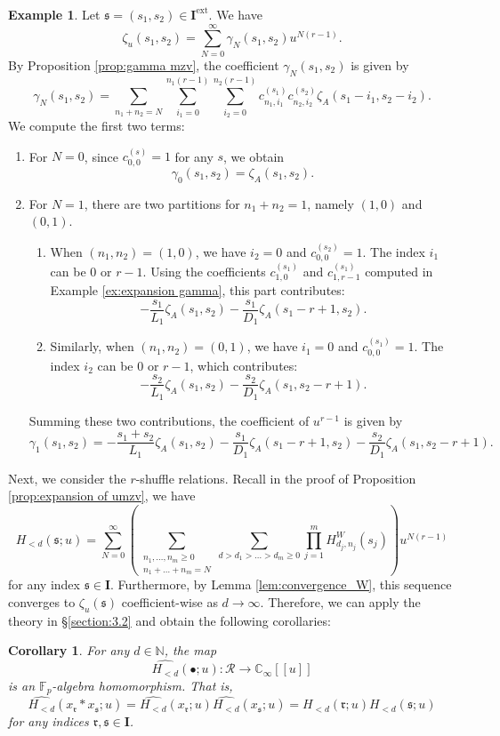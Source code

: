 \documentclass[12pt,reqno]{amsart}
\numberwithin{equation}{section}
\theoremstyle{plain}
\newtheorem{cor}[thm]{Corollary}
\theoremstyle{definition}
\newtheorem{ex}[thm]{Example}
\theoremstyle{remark}
\newcommand{\NN}{\mathbb{N}}
\newcommand{\CC}{\mathbb{C}}
\newcommand{\FF}{\mathbb{F}}
\newcommand{\Rcal}{\mathcal{R}}
\newcommand{\mbb}[1]{[\![{#1}]\!]}
\newcommand{\ww}[1]{\mathfrak{#1}}
\newcommand{\Ical}{\mathbf{I}}
\newcommand{\ext}{\mathrm{ext}}
\begin{document}
\begin{ex}\label{ex:expansion gamma depth 2}
Let $\ww{s} = (s_1, s_2) \in \Ical^{\ext}$. We have
$$\zeta_u(s_1, s_2) = \sum_{N=0}^{\infty} \gamma_N(s_1, s_2) u^{N(r-1)}.$$
By Proposition \ref{prop:gamma mzv}, the coefficient $\gamma_N(s_1, s_2)$ is given by 
$$\gamma_N(s_1, s_2) = \sum_{n_1+n_2=N} \sum_{i_1=0}^{n_1(r-1)} \sum_{i_2=0}^{n_2(r-1)} c_{n_1,i_1}^{(s_1)} c_{n_2,i_2}^{(s_2)} \zeta_A(s_1-i_1, s_2-i_2).$$
We compute the first two terms:
\begin{enumerate}
    \item For $N=0$, since $c_{0,0}^{(s)} = 1$ for any $s$, we obtain 
    $$\gamma_0(s_1, s_2) = \zeta_A(s_1, s_2).$$

    \item For $N=1$, there are two partitions for $n_1 + n_2 = 1$, namely $(1, 0)$ and $(0, 1)$. 
    \begin{enumerate}
        \item When $(n_1, n_2) = (1, 0)$, we have $i_2 = 0$ and $c_{0,0}^{(s_2)}=1$. The index $i_1$ can be $0$ or $r-1$. Using the coefficients $c_{1,0}^{(s_1)}$ and $c_{1,r-1}^{(s_1)}$ computed in Example \ref{ex:expansion gamma}, this part contributes:
        $$-\frac{s_1}{L_1} \zeta_A(s_1, s_2) - \frac{s_1}{D_1} \zeta_A(s_1-r+1, s_2).$$
        \item Similarly, when $(n_1, n_2) = (0, 1)$, we have $i_1 = 0$ and $c_{0,0}^{(s_1)}=1$. The index $i_2$ can be $0$ or $r-1$, which contributes:
        $$-\frac{s_2}{L_1} \zeta_A(s_1, s_2) - \frac{s_2}{D_1} \zeta_A(s_1, s_2-r+1).$$
    \end{enumerate}
    Summing these two contributions, the coefficient of $u^{r-1}$ is given by
    $$\gamma_1(s_1, s_2) = -\frac{s_1+s_2}{L_1} \zeta_A(s_1, s_2) - \frac{s_1}{D_1} \zeta_A(s_1-r+1, s_2) - \frac{s_2}{D_1} \zeta_A(s_1, s_2-r+1).$$
\end{enumerate}
\end{ex}

Next, we consider the $r$-shuffle relations. Recall in the proof of Proposition \ref{prop:expansion of umzv}, we have
$$H_{<d}(\ww{s};u) = \sum_{N=0}^{\infty} \left( \sum_{\substack{n_1, \dots, n_m \ge 0 \\ n_1 + \dots + n_m = N}} \sum_{d > d_1 > \dots > d_m \ge 0} \prod_{j=1}^m H^W_{d_j,n_j}(s_j) \right) u^{N(r-1)}$$
for any index $\ww{s}\in\Ical$. Furthermore, by Lemma \ref{lem:convergence_W}, this sequence converges to $\zeta_u(\ww{s})$ coefficient-wise as $d \to \infty$. Therefore, we can apply the theory in \S \ref{section:3.2} and obtain the following corollaries:
\begin{cor}\label{cor:Hu shuffle formal}
    For any $d\in\NN$, the map $$\widehat{H_{<d}}(\bullet;u):\Rcal\to \CC_\infty\mbb{u}$$ is an $\FF_p$-algebra homomorphism. That is,
    $$\widehat{H_{<d}}(x_{\ww{r}}\ast x_{\ww{s}};u) =\widehat{H_{<d}}(x_{\ww{r}};u)\widehat{H_{<d}}(x_{\ww{s}};u)=H_{<d}(\ww{r};u)H_{<d}(\ww{s};u)$$
    for any indices $\ww{r},\ww{s}\in\Ical$.
\end{cor}
\end{document}
